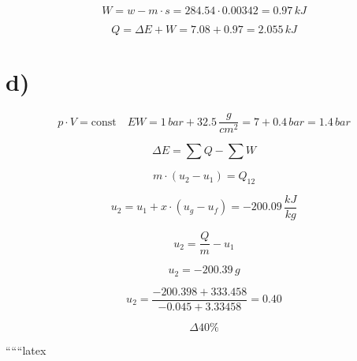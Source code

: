 \[
W = w - m \cdot s = 284.54 \cdot 0.00342 = 0.97 \, kJ
\]

\[
Q = \Delta E + W = 7.08 + 0.97 = 2.055 \, kJ
\]

\section*{d)}

\[
p \cdot V = \text{const} \quad EW = 1 \, bar + 32.5 \, \frac{g}{cm^2} = 7 + 0.4 \, bar = 1.4 \, bar
\]

\[
\Delta E = \sum Q - \sum W
\]

\[
m \cdot (u_2 - u_1) = Q_{12}
\]

\[
u_2 = u_1 + x \cdot (u_g - u_f) = -200.09 \, \frac{kJ}{kg}
\]

\[
u_2 = \frac{Q}{m} - u_1
\]

\[
u_2 = -200.39 \, g
\]

\[
u_2 = \frac{-200.398 + 333.458}{-0.045 + 3.33458} = 0.40
\]

\[
\Delta 40\%
\]

``````latex


